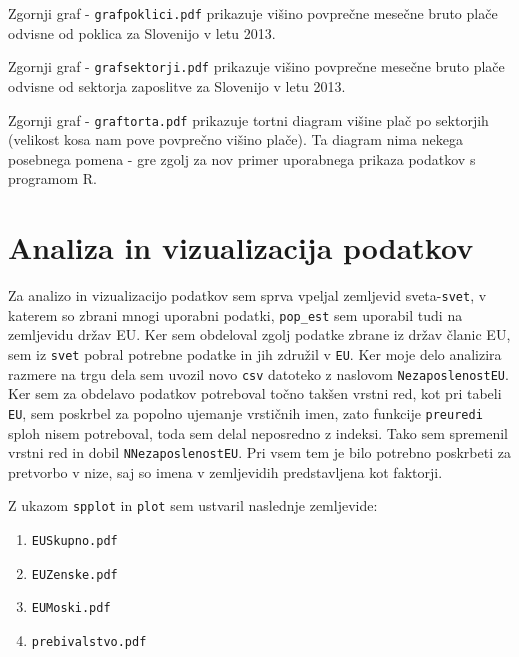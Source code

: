 \documentclass[11pt,a4paper]{article}
\begin{document}

Zgornji graf - \verb|grafpoklici.pdf| prikazuje višino povprečne mesečne bru\-to plače odvisne od poklica za Slovenijo v letu 2013. 


Zgornji graf - \verb|grafsektorji.pdf| prikazuje višino povprečne mesečne bru\-to plače odvisne od sektorja zaposlitve za Slovenijo v letu 2013. 


Zgornji graf - \verb|graftorta.pdf| prikazuje tortni diagram višine plač po sektorjih (velikost kosa nam pove povprečno višino plače). Ta diagram nima nekega posebnega pomena - gre zgolj za nov primer uporabnega prikaza podatkov s programom R. 
\pagebreak
\section{Analiza in vizualizacija podatkov}

Za analizo in vizualizacijo podatkov sem sprva vpeljal zemljevid sveta-\verb|svet|, v katerem so zbrani mnogi uporabni podatki, \verb|pop_est| sem uporabil tudi na zemljevidu držav EU. Ker sem obdeloval zgolj podatke zbrane iz držav članic EU, sem iz \verb|svet| pobral potrebne podatke in jih združil v \verb|EU|. Ker moje delo analizira razmere na trgu dela sem uvozil novo \verb|csv| datoteko z naslovom \verb|NezaposlenostEU|. Ker sem za obdelavo podatkov potreboval točno takšen vrstni red, kot pri tabeli \verb|EU|, sem poskrbel za popolno ujemanje vrstičnih imen, zato funkcije \verb|preuredi| sploh nisem potreboval, toda sem delal neposredno z indeksi. Tako sem spremenil vrstni red in dobil \verb|NNezaposlenostEU|. Pri vsem tem je bilo potrebno poskrbeti za pretvorbo v nize, saj so imena v zemljevidih predstavljena kot faktorji. 

Z ukazom \verb|spplot| in \verb|plot| sem ustvaril naslednje zemljevide: 
\begin{enumerate} 
\item{\verb|EUSkupno.pdf|}

\item{\verb|EUZenske.pdf|}

\item{\verb|EUMoski.pdf|}

\item{\verb|prebivalstvo.pdf|}
\end{enumerate}
\end{document}
